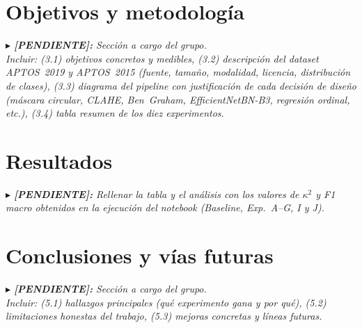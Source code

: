 \documentclass[12pt, a4paper]{article}
\newcommand{\pendiente}[1]{%
  \vspace{4pt}%
  \colorbox{amarillotodo}{%
    \parbox{\dimexpr\linewidth-2\fboxsep}{%
      \small\itshape%
      $\blacktriangleright$ \textbf{[PENDIENTE]:} #1%
    }%
  }%
  \vspace{4pt}%
}
\begin{document}
\section{Objetivos y metodología}
\label{sec:metodologia}

\pendiente{Sección a cargo del grupo.\\
  Incluir: (3.1) objetivos concretos y medibles, (3.2) descripción del dataset
  APTOS~2019 y APTOS~2015 (fuente, tamaño, modalidad, licencia, distribución de
  clases), (3.3) diagrama del pipeline con justificación de cada decisión de diseño
  (máscara circular, CLAHE, Ben~Graham, EfficientNetBN-B3, regresión ordinal, etc.),
  (3.4) tabla resumen de los diez experimentos.}

\section{Resultados}
\label{sec:resultados}

\pendiente{Rellenar la tabla y el análisis con los valores de $\kappa^2$ y F1 macro
  obtenidos en la ejecución del notebook (Baseline, Exp.~A--G, I y J).}

\section{Conclusiones y vías futuras}
\label{sec:conclusiones}

\pendiente{Sección a cargo del grupo.\\
  Incluir: (5.1) hallazgos principales (qué experimento gana y por qué),
  (5.2) limitaciones honestas del trabajo, (5.3) mejoras concretas y líneas futuras.}

\newpage
\printbibliography[heading=bibintoc, title={Bibliografía}]

\newpage
\appendix
\end{document}
